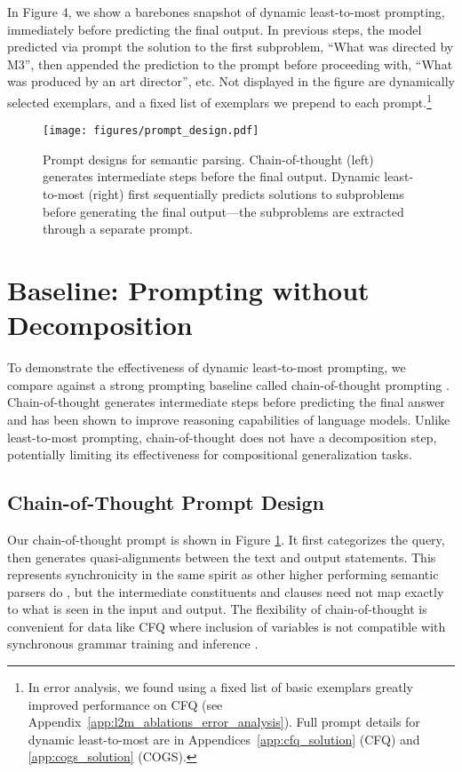 \documentclass{article} \usepackage{iclr2022_conference,times}
\begin{document}
In Figure 4, we show a barebones snapshot of dynamic least-to-most prompting, immediately before predicting the final output. In previous steps, the model predicted via prompt the solution to the first subproblem, ``What was directed by M3'', then appended the prediction to the prompt before proceeding with, ``What was produced by an art director'', etc. Not displayed in the figure are dynamically selected exemplars, and a fixed list of exemplars we prepend to each prompt.\footnote{In error analysis, we found using a fixed list of basic exemplars greatly improved performance on CFQ (see Appendix~\ref{app:l2m_ablations_error_analysis}). Full prompt details for dynamic least-to-most are in Appendices~\ref{app:cfq_solution} (CFQ) and \ref{app:cogs_solution} (COGS).}

\begin{figure}[t!]
    \centering
    \texttt{[image: figures/prompt\_design.pdf]}
    \caption{Prompt designs for semantic parsing. Chain-of-thought (left) generates intermediate steps before the final output. Dynamic least-to-most (right) first sequentially predicts solutions to subproblems before generating the final output---the subproblems are extracted through a separate prompt.}
    \label{fig:cot}
\end{figure}


\section{Baseline: Prompting without Decomposition \label{sec:cot}}

To demonstrate the effectiveness of dynamic least-to-most prompting, we compare against a strong prompting baseline called chain-of-thought prompting \citep{Wei2022ChainOT}. Chain-of-thought generates intermediate steps before predicting the final answer and has been shown to improve reasoning capabilities of language models.
Unlike least-to-most prompting, chain-of-thought does not have a decomposition step, potentially limiting its effectiveness for compositional generalization tasks. 

\subsection{Chain-of-Thought Prompt Design}

Our chain-of-thought prompt is shown in Figure \ref{fig:cot}. It first categorizes the query, then generates quasi-alignments between the text and output statements. This represents synchronicity in the same spirit as other higher performing semantic parsers do \citep{qiu-etal-2022-improving}, but the intermediate constituents and clauses need not map exactly to what is seen in the input and output. The flexibility of chain-of-thought is convenient for data like CFQ where inclusion of variables is not compatible with synchronous grammar training and inference \citep{wong-mooney-2007-learning}.
\end{document}
